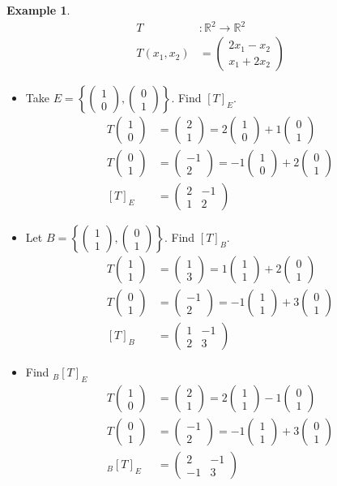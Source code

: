 \documentclass{report}
\theoremstyle{remark}
\theoremstyle{definition}
\theoremstyle{definition}
\newtheorem{example}[theorem]{Example}
\theoremstyle{theorem}
\providecommand{\vectii}[2]{\begin{pmatrix}#1\\#2\end{pmatrix}}
\begin{document}
\begin{example}
    \begin{align*}
        T&:\mathbb{R}^2\rightarrow \mathbb{R}^2\\
        T(x_1,x_2)&= \begin{pmatrix}
        2x_1-x_2\\ x_1+2x_2
        \end{pmatrix}
    \end{align*}
    \begin{itemize}
        \item Take $E= \left\{\begin{pmatrix}
        1\\0
        \end{pmatrix},\begin{pmatrix}0\\1\end{pmatrix}\right\}$. Find $[T]_E$.
        \begin{align*}
        T\vectii{1}{0} &= \vectii{2}{1}=2\vectii{1}{0}+1\vectii{0}{1}\\
        T\vectii{0}{1}&=\vectii{-1}{2}=-1\vectii{1}{0}+2\vectii{0}{1}\\
        [T]_E&= \begin{pmatrix}2&-1\\1&2\end{pmatrix}
        \end{align*}
        \item Let $B = \left\{\vectii{1}{1}, \vectii{0}{1}\right\}$. Find $[T]_B$.
        \begin{align*}
        T\vectii{1}{1}&=\vectii{1}{3}=1\vectii{1}{1}+2\vectii{0}{1}\\
        T\vectii{0}{1}&=\vectii{-1}{2}=-1\vectii{1}{1}+3\vectii{0}{1}\\
        [T]_B&=\begin{pmatrix}1&-1\\2&3\end{pmatrix}
        \end{align*}
        \item Find $_B[T]_E$
        \begin{align*}
        T\vectii{1}{0}&=\vectii{2}{1}=2\vectii{1}{1}-1\vectii{0}{1}\\
        T\vectii{0}{1}&=\vectii{-1}{2}=-1\vectii{1}{1}+3\vectii{0}{1}\\
        _B[T]_E&= \begin{pmatrix}2&-1\\-1&3\end{pmatrix}
        \end{align*}
    \end{itemize}
\end{example}
\end{document}

